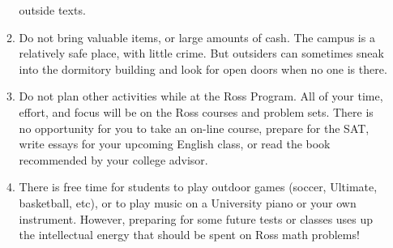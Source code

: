 \documentclass[11pt]{rossasia}
\begin{document}
\begin{enumerate}[label=(\arabic*),itemsep=2em,topsep=-1em]
\begin{enumerate}[label=(\alph*),itemsep=0.5em,topsep=0em]
    outside texts.
  \item Do not bring valuable items, or large amounts of cash.  The
    campus is a relatively safe place, with little crime.  But
    outsiders can sometimes sneak into the dormitory building and look
    for open doors when no one is there.
  \item Do not plan other activities while at the Ross Program. All of 
    your time, effort, and focus will be on the Ross courses and problem 
    sets.  There is no opportunity for you to take an on-line course, 
    prepare  for the SAT, write essays for your upcoming English 
    class, or read the book recommended by your college advisor.
  \item There is free time for students to play outdoor games (soccer, Ultimate, 
    basketball, etc), or to play music on a University piano or your own 
    instrument.   However, preparing for some future tests or classes uses up 
    the intellectual energy that should be spent on Ross math problems!
\end{enumerate}
\end{enumerate}
\end{document}
